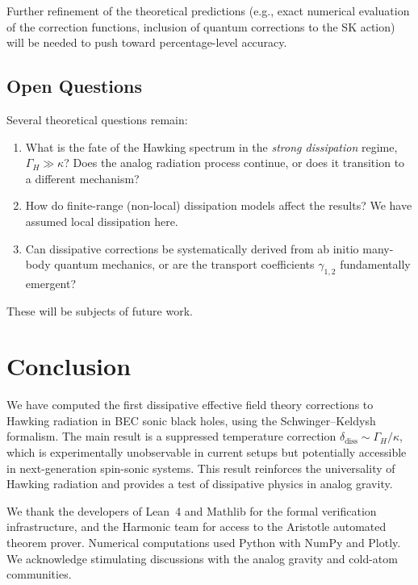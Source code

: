 \documentclass[aps,prl,twocolumn,superscriptaddress,nofootinbib,amsmath,amssymb]{revtex4-2}
\begin{document}
Further refinement of the theoretical predictions (e.g., exact numerical evaluation of the correction functions, inclusion of quantum corrections to the SK action) will be needed to push toward percentage-level accuracy.

\subsection{Open Questions}

Several theoretical questions remain:
\begin{enumerate}
\item What is the fate of the Hawking spectrum in the \textit{strong dissipation} regime, $\Gamma_H \gg \kappa$? Does the analog radiation process continue, or does it transition to a different mechanism?
\item How do finite-range (non-local) dissipation models affect the results? We have assumed local dissipation here.
\item Can dissipative corrections be systematically derived from ab initio many-body quantum mechanics, or are the transport coefficients $\gamma_{1,2}$ fundamentally emergent?
\end{enumerate}

These will be subjects of future work.

\section{Conclusion}

We have computed the first dissipative effective field theory corrections to Hawking radiation in BEC sonic black holes, using the Schwinger--Keldysh formalism. The main result is a suppressed temperature correction $\delta_{\text{diss}} \sim \Gamma_H / \kappa$, which is experimentally unobservable in current setups but potentially accessible in next-generation spin-sonic systems. This result reinforces the universality of Hawking radiation and provides a test of dissipative physics in analog gravity.

\begin{acknowledgments}
We thank the developers of Lean~4 and Mathlib for the formal verification infrastructure, and the Harmonic team for access to the Aristotle automated theorem prover. Numerical computations used Python with NumPy and Plotly. We acknowledge stimulating discussions with the analog gravity and cold-atom communities.
\end{acknowledgments}
\end{document}

